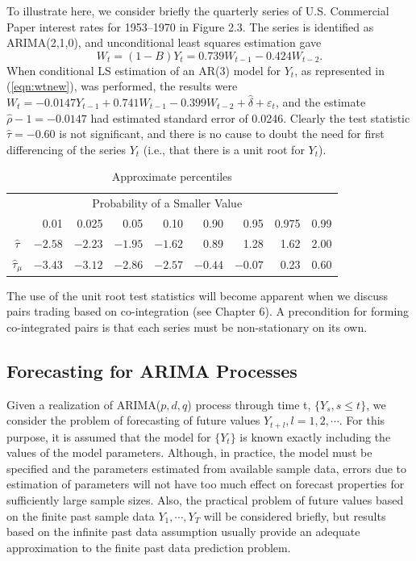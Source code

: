 \begin{ex} 
To illustrate here, we consider briefly the quarterly series of U.S. Commercial Paper interest rates for 1953--1970 in Figure 2.3. The series is identified as ARIMA(2,1,0), and unconditional least squares estimation gave 
	\[
	W_t = (1 - B)Y_t = 0.739W_{t-1} - 0.424W_{t-2}.
	\]
When conditional LS estimation of an AR(3) model for $Y_t$, as represented in (\ref{eqn:wtnew}), was performed, the results were $W_t = -0.0147Y_{t-1} + 0.741W_{t-1} - 0.399W_{t-2} + \hat{\delta} + \varepsilon_t$, and the estimate $\hat{\rho} - 1 = -0.0147$ had estimated standard error of 0.0246. Clearly the test statistic $\hat{\tau} = -0.60$ is not significant, and there is no cause to doubt the need for first differencing of the series $Y_t$ (i.e., that there is a unit root for $Y_t$).

	\begin{table}[!ht]
	\centering
	\caption{Approximate percentiles \label{tab:percentiles}}
	\begin{tabular}{crrrrrrrr}
	& \multicolumn{7}{c}{Probability of a Smaller Value} \\
	& 0.01 & 0.025 & 0.05 & 0.10 & 0.90 & 0.95 & 0.975 & 0.99 \\ \hline
	$\hat{\tau}$ & $-2.58$ & $-2.23$ & $-1.95$ & $-1.62$  &0.89 & 1.28 & 1.62 & 2.00 \\
	$\hat{\tau}_\mu$ & $-3.43$ & $-3.12$ & $-2.86$ & $-2.57$ & $-0.44$ & $-0.07$ & 0.23 & 0.60
	\end{tabular}
	\end{table}

The use of the unit root test statistics will become apparent when we discuss pairs trading based on co-integration (see Chapter 6). A precondition for forming co-integrated pairs is that each series must be non-stationary on its own. 
\end{ex}


\subsection{Forecasting for ARIMA Processes} \hfill


Given a realization of ARIMA($p,d,q$) process through time t, $\{Y_s, s\leq t\}$, we consider the problem of forecasting of future values $Y_{t+l}, l = 1,2,\cdots$. For this purpose, it is assumed that the model for $\{Y_t\}$ is known exactly including the values of the model parameters. Although, in practice, the model must be specified and the parameters estimated from available sample data, errors due to estimation of parameters will not have too much effect on forecast properties for sufficiently large sample sizes. Also, the practical problem of future values based on the finite past sample data $Y_1,\cdots,Y_T$ will be considered briefly, but results based on the infinite past data assumption usually provide an adequate approximation to the finite past data prediction problem. \\


